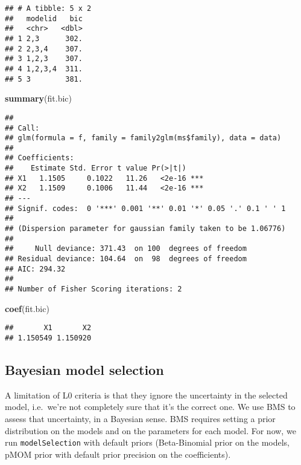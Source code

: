 \documentclass[
]{book}
\newenvironment{Shaded}{\begin{snugshade}}{\end{snugshade}}
\newcommand{\DecValTok}[1]{\textcolor[rgb]{0.00,0.00,0.81}{#1}}
\newcommand{\FunctionTok}[1]{\textcolor[rgb]{0.13,0.29,0.53}{\textbf{#1}}}
\newcommand{\NormalTok}[1]{#1}
\newcommand{\SpecialCharTok}[1]{\textcolor[rgb]{0.81,0.36,0.00}{\textbf{#1}}}
\theoremstyle{definition}
\theoremstyle{definition}
\theoremstyle{definition}
\theoremstyle{definition}
\theoremstyle{remark}
\begin{document}
\begin{Shaded}
\end{Shaded}

\begin{verbatim}
## # A tibble: 5 x 2
##   modelid   bic
##   <chr>   <dbl>
## 1 2,3      302.
## 2 2,3,4    307.
## 3 1,2,3    307.
## 4 1,2,3,4  311.
## 5 3        381.
\end{verbatim}

\begin{Shaded}
\begin{Highlighting}[]
\FunctionTok{summary}\NormalTok{(fit.bic)}
\end{Highlighting}
\end{Shaded}

\begin{verbatim}
## 
## Call:
## glm(formula = f, family = family2glm(ms$family), data = data)
## 
## Coefficients:
##    Estimate Std. Error t value Pr(>|t|)    
## X1   1.1505     0.1022   11.26   <2e-16 ***
## X2   1.1509     0.1006   11.44   <2e-16 ***
## ---
## Signif. codes:  0 '***' 0.001 '**' 0.01 '*' 0.05 '.' 0.1 ' ' 1
## 
## (Dispersion parameter for gaussian family taken to be 1.06776)
## 
##     Null deviance: 371.43  on 100  degrees of freedom
## Residual deviance: 104.64  on  98  degrees of freedom
## AIC: 294.32
## 
## Number of Fisher Scoring iterations: 2
\end{verbatim}

\begin{Shaded}
\begin{Highlighting}[]
\FunctionTok{coef}\NormalTok{(fit.bic)}
\end{Highlighting}
\end{Shaded}

\begin{verbatim}
##       X1       X2 
## 1.150549 1.150920
\end{verbatim}

\subsection{Bayesian model selection}\label{bayesian-model-selection}

A limitation of L0 criteria is that they ignore the uncertainty in the selected model, i.e.~we're not completely sure that it's the correct one.
We use BMS to assess that uncertainty, in a Bayesian sense.
BMS requires setting a prior distribution on the models and on the parameters for each model.
For now, we run \texttt{modelSelection} with default priors (Beta-Binomial prior on the models, pMOM prior with default prior precision on the coefficients).
\end{document}
